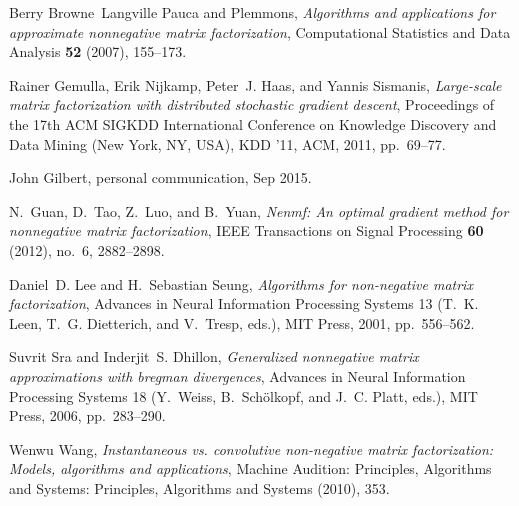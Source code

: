 \documentclass[conference]{IEEEtran}
\begin{document}
%
%
%
\begin{thebibliography}{6}

Berry Browne~Langville Pauca and Plemmons, \emph{Algorithms and applications
  for approximate nonnegative matrix factorization}, Computational Statistics
  and Data Analysis \textbf{52} (2007), 155--173.

Rainer Gemulla, Erik Nijkamp, Peter~J. Haas, and Yannis Sismanis,
  \emph{Large-scale matrix factorization with distributed stochastic gradient
  descent}, Proceedings of the 17th ACM SIGKDD International Conference on
  Knowledge Discovery and Data Mining (New York, NY, USA), KDD '11, ACM, 2011,
  pp.~69--77.
  
John Gilbert, personal communication, Sep 2015.

N.~Guan, D.~Tao, Z.~Luo, and B.~Yuan, \emph{Nenmf: An optimal gradient method
  for nonnegative matrix factorization}, IEEE Transactions on Signal Processing
  \textbf{60} (2012), no.~6, 2882--2898.

Daniel~D. Lee and H.~Sebastian Seung, \emph{Algorithms for non-negative matrix
  factorization}, Advances in Neural Information Processing Systems 13 (T.~K.
  Leen, T.~G. Dietterich, and V.~Tresp, eds.), MIT Press, 2001, pp.~556--562.

Suvrit Sra and Inderjit~S. Dhillon, \emph{Generalized nonnegative matrix
  approximations with bregman divergences}, Advances in Neural Information
  Processing Systems 18 (Y.~Weiss, B.~Sch\"{o}lkopf, and J.~C. Platt, eds.),
  MIT Press, 2006, pp.~283--290.

Wenwu Wang, \emph{Instantaneous vs. convolutive non-negative matrix
  factorization: Models, algorithms and applications}, Machine Audition:
  Principles, Algorithms and Systems: Principles, Algorithms and Systems
  (2010), 353.

\end{thebibliography}


\end{document}
